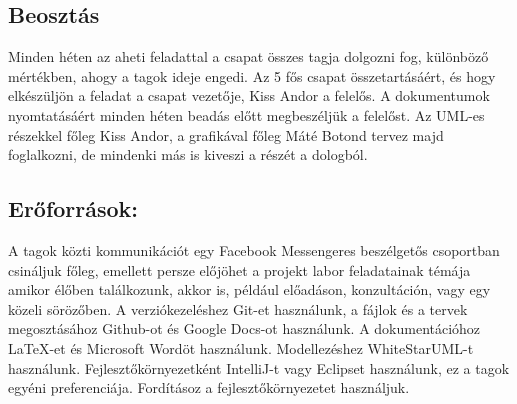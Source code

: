 \subsection{Beosztás}
Minden héten az aheti feladattal a csapat összes tagja dolgozni fog, különböző mértékben, ahogy a tagok ideje engedi. Az 5 fős csapat összetartásáért, és hogy elkészüljön a feladat a csapat vezetője, Kiss Andor a felelős. A dokumentumok nyomtatásáért minden héten beadás előtt megbeszéljük a felelőst. Az UML-es részekkel főleg Kiss Andor, a grafikával főleg Máté Botond tervez majd foglalkozni, de mindenki más is kiveszi a részét a dologból.

\subsection{Erőforrások:}
A tagok közti kommunikációt egy Facebook Messengeres beszélgetős csoportban csináljuk főleg, emellett persze előjöhet a projekt labor feladatainak témája amikor élőben találkozunk, akkor is, például előadáson, konzultáción, vagy egy közeli sörözőben.
A verziókezeléshez Git-et használunk, a fájlok és a tervek megosztásához Github-ot és Google Docs-ot használunk.
A dokumentációhoz LaTeX-et és Microsoft Wordöt használunk.
Modellezéshez WhiteStarUML-t használunk.
Fejlesztőkörnyezetként IntelliJ-t vagy Eclipset használunk, ez a tagok egyéni preferenciája.
Fordításoz a fejlesztőkörnyezetet használjuk.




